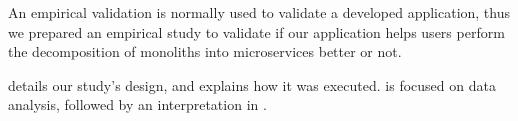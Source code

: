 An empirical validation is normally used to validate a developed application, thus we prepared an empirical study to validate if our application helps users perform the decomposition of monoliths into microservices better or not.

 details our study's design, and  explains how it was executed.  is focused on data analysis, followed by an interpretation in .
